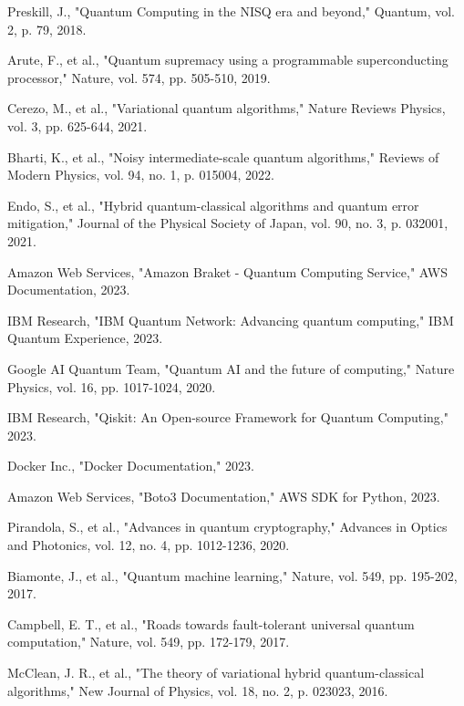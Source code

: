 \documentclass[onecolumn]{IEEEtran}
\begin{document}
\begin{thebibliography}{15}

Preskill, J., "Quantum Computing in the NISQ era and beyond," Quantum, vol. 2, p. 79, 2018.

Arute, F., et al., "Quantum supremacy using a programmable superconducting processor," Nature, vol. 574, pp. 505-510, 2019.

Cerezo, M., et al., "Variational quantum algorithms," Nature Reviews Physics, vol. 3, pp. 625-644, 2021.

Bharti, K., et al., "Noisy intermediate-scale quantum algorithms," Reviews of Modern Physics, vol. 94, no. 1, p. 015004, 2022.

Endo, S., et al., "Hybrid quantum-classical algorithms and quantum error mitigation," Journal of the Physical Society of Japan, vol. 90, no. 3, p. 032001, 2021.

Amazon Web Services, "Amazon Braket - Quantum Computing Service," AWS Documentation, 2023.

IBM Research, "IBM Quantum Network: Advancing quantum computing," IBM Quantum Experience, 2023.

Google AI Quantum Team, "Quantum AI and the future of computing," Nature Physics, vol. 16, pp. 1017-1024, 2020.

IBM Research, "Qiskit: An Open-source Framework for Quantum Computing," 2023.

Docker Inc., "Docker Documentation," 2023.

Amazon Web Services, "Boto3 Documentation," AWS SDK for Python, 2023.

Pirandola, S., et al., "Advances in quantum cryptography," Advances in Optics and Photonics, vol. 12, no. 4, pp. 1012-1236, 2020.

Biamonte, J., et al., "Quantum machine learning," Nature, vol. 549, pp. 195-202, 2017.

Campbell, E. T., et al., "Roads towards fault-tolerant universal quantum computation," Nature, vol. 549, pp. 172-179, 2017.

McClean, J. R., et al., "The theory of variational hybrid quantum-classical algorithms," New Journal of Physics, vol. 18, no. 2, p. 023023, 2016.


\end{thebibliography}
\end{document}

